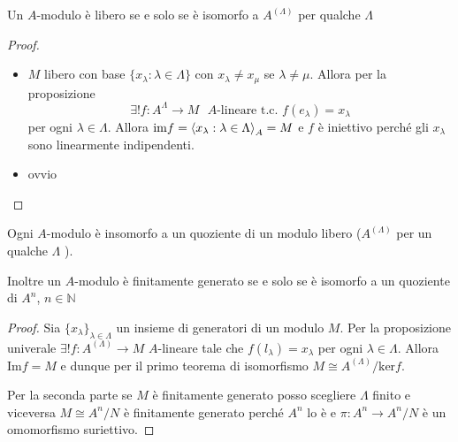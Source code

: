 \begin{corollary}{}
    Un \(A\)-modulo è libero se e solo se è isomorfo a \(A^{{(\Lambda)}}\) per
    qualche \(\Lambda\) 
\end{corollary}
\begin{proof}\( \)
\begin{itemize}
    \item[\(\implies \)] \(M\) libero con base \(\{x_\lambda : \lambda \in \Lambda\}\) con \(x_\lambda\neq x_\mu\) se \(\lambda \neq \mu\). Allora per la proposizione
        \[
          \exists ! f : A^{\Lambda} \to M \text{ \(A\)-lineare t.c. } f{(e_\lambda)} = x_\lambda 
        \]
        per ogni \(\lambda \in \Lambda\).
        Allora \(\mathrm{im}f = {\left\langle x_{\lambda} : \lambda \in \Lambda\right\rangle}_A = M\) e \(f\) è iniettivo perché gli \(x_\lambda\) sono linearmente indipendenti.
    \item[\(\impliedby \)] ovvio
\end{itemize}
\end{proof}

\begin{corollary}{}
    Ogni \(A\)-modulo è insomorfo a un quoziente di un modulo libero (\(A^{{(\Lambda)}}\) per un qualche \(\Lambda\) ).

    Inoltre un \(A\)-modulo è finitamente generato se e solo se è isomorfo a un quoziente di \(A^{n}\), \(n \in \mathbb{N}\) 
\end{corollary}
\begin{proof}{}
    Sia \(\{x_{\lambda} \}_{\lambda \in \Lambda}  \) un insieme di generatori di
    un modulo \(M\). Per la proposizione univerale \(\exists ! f:
    A^{{(\Lambda)}}\to M\) \(A\)-lineare tale che \(f(l_\lambda) = x_\lambda\)
    per ogni \(\lambda \in \Lambda\). Allora \(\mathrm{Im}f = M\) e dunque per
    il primo teorema di isomorfismo \(M \cong A^{{(\Lambda)}} / \mathrm{ker}f\).

    Per la seconda parte se \(M\) è finitamente generato posso scegliere
    \(\Lambda\) finito e viceversa \(M\cong A^{n} / N\) è finitamente generato
    perché \(A^{n}\) lo è e \(\pi : A^{n}\to A^{n} / N\) è un omomorfismo
    suriettivo.

\end{proof}

